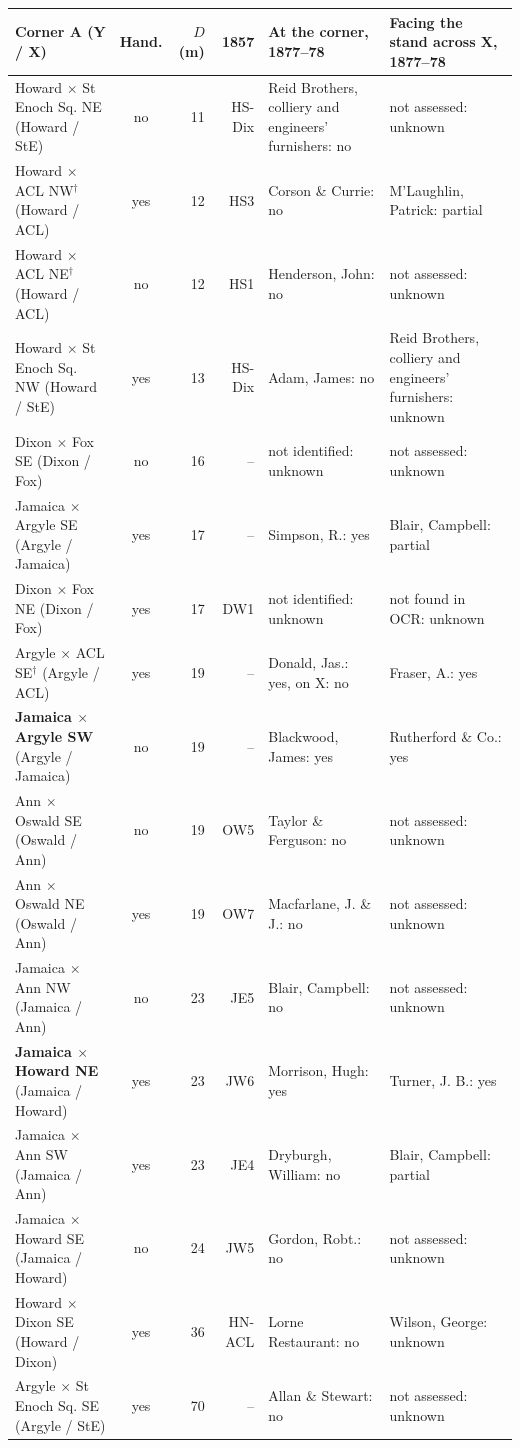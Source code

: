 \begin{tabular}{>{\raggedright\arraybackslash}p{3.0cm}crr>{\raggedright\arraybackslash}p{3.6cm}>{\raggedright\arraybackslash}p{3.6cm}}
\toprule
Corner A (Y / X) & Hand. & $D$ (m) & 1857 &  At the corner, 1877--78 & Facing the stand across X, 1877--78 \\
\midrule
Howard $\times$ St Enoch Sq. NE (Howard / StE) & no & 11 & HS-Dix & Reid Brothers, colliery and engineers' furnishers: no & not assessed: unknown \\
Howard $\times$ ACL NW$^\dagger$ (Howard / ACL) & yes & 12 & HS3 & Corson \& Currie: no & M'Laughlin, Patrick: partial \\
Howard $\times$ ACL NE$^\dagger$ (Howard / ACL) & no & 12 & HS1 & Henderson, John: no & not assessed: unknown \\
Howard $\times$ St Enoch Sq. NW (Howard / StE) & yes & 13 & HS-Dix & Adam, James: no & Reid Brothers, colliery and engineers' furnishers: unknown \\
Dixon $\times$ Fox SE (Dixon / Fox) & no & 16 & -- & not identified: unknown & not assessed: unknown \\
Jamaica $\times$ Argyle SE (Argyle / Jamaica) & yes & 17 & -- & Simpson, R.: yes & Blair, Campbell: partial \\
Dixon $\times$ Fox NE (Dixon / Fox) & yes & 17 & DW1 & not identified: unknown & not found in OCR: unknown \\
Argyle $\times$ ACL SE$^\dagger$ (Argyle / ACL) & yes & 19 & -- & Donald, Jas.: yes, on X: no & Fraser, A.: yes \\
\textbf{Jamaica $\times$ Argyle SW} (Argyle / Jamaica) & no & 19 & -- & Blackwood, James: yes & Rutherford \& Co.: yes \\
Ann $\times$ Oswald SE (Oswald / Ann) & no & 19 & OW5 & Taylor \& Ferguson: no & not assessed: unknown \\
Ann $\times$ Oswald NE (Oswald / Ann) & yes & 19 & OW7 & Macfarlane, J. \& J.: no & not assessed: unknown \\
Jamaica $\times$ Ann NW (Jamaica / Ann) & no & 23 & JE5 & Blair, Campbell: no & not assessed: unknown \\
\textbf{Jamaica $\times$ Howard NE} (Jamaica / Howard) & yes & 23 & JW6 & Morrison, Hugh: yes & Turner, J. B.: yes \\
Jamaica $\times$ Ann SW (Jamaica / Ann) & yes & 23 & JE4 & Dryburgh, William: no & Blair, Campbell: partial \\
Jamaica $\times$ Howard SE (Jamaica / Howard) & no & 24 & JW5 & Gordon, Robt.: no & not assessed: unknown \\
Howard $\times$ Dixon SE (Howard / Dixon) & yes & 36 & HN-ACL & Lorne Restaurant: no & Wilson, George: unknown \\
Argyle $\times$ St Enoch Sq. SE (Argyle / StE) & yes & 70 & -- & Allan \& Stewart: no & not assessed: unknown \\
\bottomrule
\end{tabular}
